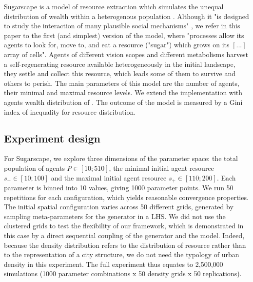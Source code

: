 \documentclass[3p,times,procedia]{elsarticle}
\begin{document}
Sugarscape is a model of resource extraction which simulates the unequal distribution of wealth within a heterogenous population \cite{EpsteinAxtell1996}. Although it "is designed to study the interaction of many plausible social mechanisms" \cite[p.125]{Axtelletal1996}, we refer in this paper to the first (and simplest) version of the model, where "processes allow its agents to look for, move to, and eat a resource ("sugar") which grows on its $[...]$ array of cells". Agents of different vision scopes and different metabolisms harvest a self-regenerating resource available heterogeneously in the initial landscape, they settle and collect this resource, which leads some of them to survive and others to perish. The main parameters of this model are the number of agents, their minimal and maximal resource levels.  We extend the implementation with agents wealth distribution of \cite{li2009netlogo}. The outcome of the model is measured by a Gini index of inequality for resource distribution. 

\subsection{Experiment design}
For Sugarscape, we explore three dimensions of the parameter space: the total population of agents $P\in \left[10;510\right]$, the minimal initial agent resource $s_{-}\in \left[10;100\right]$ and the maximal initial agent resource $s_{+}\in \left[110;200\right]$. Each parameter is binned into 10 values, giving 1000 parameter points. We run 50 repetitions for each configuration, which yields reasonable convergence properties. The initial spatial configuration varies across 50 different grids, generated by sampling meta-parameters for the generator in a LHS. We did not use the clustered grids to test the flexibility of our framework, which is demonstrated in this case by a direct sequential coupling of the generator and the model. Indeed, because the density distribution refers to the distribution of resource rather than to the representation of a city structure, we do not need the typology of urban density in this experiment. The full experiment thus equates to 2,500,000 simulations (1000 parameter combinations x 50 density grids x 50 replications). 
\end{document}
